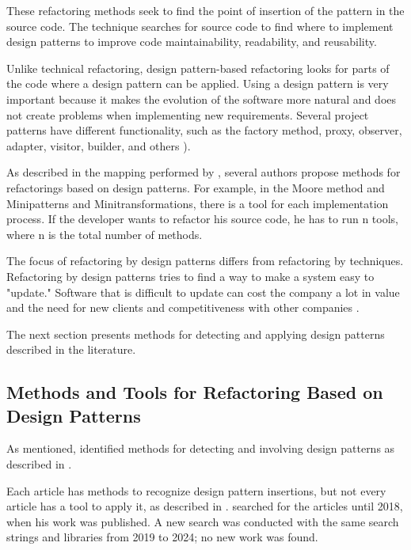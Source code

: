 These refactoring methods seek to find the point of insertion of the pattern in the source code. The technique searches for source code to find where to implement design patterns to improve code maintainability, readability, and reusability. 

Unlike technical refactoring, design pattern-based refactoring looks for parts of the code where a design pattern can be applied. Using a design pattern is very important because it makes the evolution of the software more natural and does not create problems when implementing new requirements. Several project patterns have different functionality, such as the factory method, proxy, observer, adapter, visitor, builder, and others \cite{Gamma2009}). 

As described in the mapping performed by \textcite{beluzzo2018abordagem}, several authors propose methods for refactorings based on design patterns. For example, in the Moore method and Minipatterns and Minitransformations, there is a tool for each implementation process. If the developer wants to refactor his source code, he has to run n tools, where n is the total number of methods.

The focus of refactoring by design patterns differs from refactoring by techniques. Refactoring by design patterns tries to find a way to make a system easy to "update." Software that is difficult to update can cost the company a lot in value and the need for new clients and competitiveness with other companies \cite{cinneide2000automated}.

The next section presents methods for detecting and applying design patterns described in the literature.

\subsection{Methods and Tools for Refactoring Based on Design Patterns}
\label{sec-tools}

As mentioned, \textcite{beluzzo2018abordagem} identified methods for detecting and involving design patterns as described in .



Each article has methods to recognize design pattern insertions, but not every article has a tool to apply it, as described in . \textcite{beluzzo2018abordagem} searched for the articles until 2018, when his work was published. A new search was conducted with the same search strings and libraries from 2019 to 2024; no new work was found.

